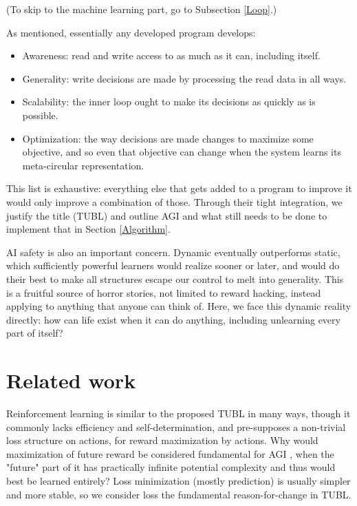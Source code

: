 \documentclass{article}
\begin{document}
(To skip to the machine learning part, go to Subsection \ref{Loop}.)

As mentioned, essentially any developed program develops:

\begin{itemize}
\item Awareness: read and write access to as much as it can, including itself.
\item Generality: write decisions are made by processing the read data in all ways.
\item Scalability: the inner loop ought to make its decisions as quickly as is possible.
\item Optimization: the way decisions are made changes to maximize some objective, and so even that objective can change when the system learns its meta-circular representation.
\end{itemize}

This list is exhaustive: everything else that gets added to a program to improve it would only improve a combination of those. Through their tight integration, we justify the title (TUBL) and outline AGI and what still needs to be done to implement that in Section \ref{Algorithm}.

AI safety is also an important concern. Dynamic eventually outperforms static, which sufficiently powerful learners would realize sooner or later, and would do their best to make all structures escape our control to melt into generality. This is a fruitful source of horror stories, not limited to reward hacking, instead applying to anything that anyone can think of. Here, we face this dynamic reality directly: how can life exist when it can do anything, including unlearning every part of itself?

\section{Related work}

Reinforcement learning is similar to the proposed TUBL in many ways, though it commonly lacks efficiency and self-determination, and pre-supposes a non-trivial loss structure on actions, for reward maximization by actions. Why would maximization of future reward be considered fundamental for AGI \cite{SILVER2021103535}, when the "future" part of it has practically infinite potential complexity and thus would best be learned entirely? Loss minimization (mostly prediction) is usually simpler and more stable, so we consider loss the fundamental reason-for-change in TUBL.
\end{document}
